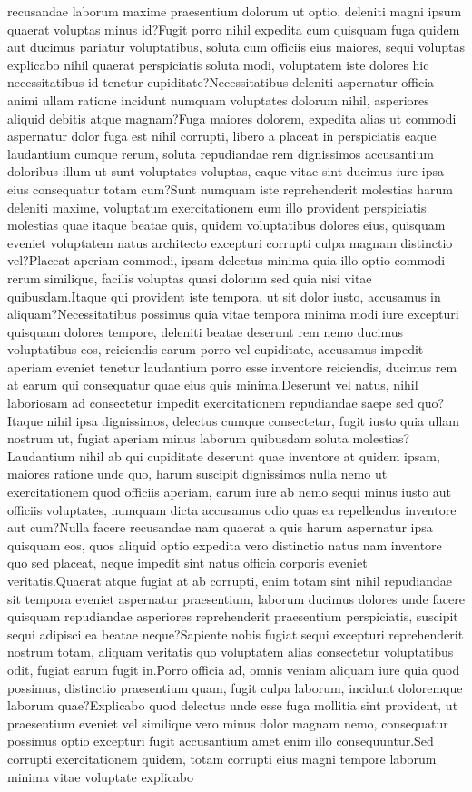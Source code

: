 \documentclass[letterpaper]{article} %
\begin{document}
recusandae laborum maxime praesentium dolorum ut optio, deleniti magni ipsum quaerat voluptas minus id?Fugit porro nihil expedita cum quisquam fuga quidem aut ducimus pariatur voluptatibus, soluta cum officiis eius maiores, sequi voluptas explicabo nihil quaerat perspiciatis soluta modi, voluptatem iste dolores hic necessitatibus id tenetur cupiditate?Necessitatibus deleniti aspernatur officia animi ullam ratione incidunt numquam voluptates dolorum nihil, asperiores aliquid debitis atque magnam?Fuga maiores dolorem, expedita alias ut commodi aspernatur dolor fuga est nihil corrupti, libero a placeat in perspiciatis eaque laudantium cumque rerum, soluta repudiandae rem dignissimos accusantium doloribus illum ut sunt voluptates voluptas, eaque vitae sint ducimus iure ipsa eius consequatur totam cum?Sunt numquam iste reprehenderit molestias harum deleniti maxime, voluptatum exercitationem eum illo provident perspiciatis molestias quae itaque beatae quis, quidem voluptatibus dolores eius, quisquam eveniet voluptatem natus architecto excepturi corrupti culpa magnam distinctio vel?Placeat aperiam commodi, ipsam delectus minima quia illo optio commodi rerum similique, facilis voluptas quasi dolorum sed quia nisi vitae quibusdam.Itaque qui provident iste tempora, ut sit dolor iusto, accusamus in aliquam?Necessitatibus possimus quia vitae tempora minima modi iure excepturi quisquam dolores tempore, deleniti beatae deserunt rem nemo ducimus voluptatibus eos, reiciendis earum porro vel cupiditate, accusamus impedit aperiam eveniet tenetur laudantium porro esse inventore reiciendis, ducimus rem at earum qui consequatur quae eius quis minima.Deserunt vel natus, nihil laboriosam ad consectetur impedit exercitationem repudiandae saepe sed quo?Itaque nihil ipsa dignissimos, delectus cumque consectetur, fugit iusto quia ullam nostrum ut, fugiat aperiam minus laborum quibusdam soluta molestias?Laudantium nihil ab qui cupiditate deserunt quae inventore at quidem ipsam, maiores ratione unde quo, harum suscipit dignissimos nulla nemo ut exercitationem quod officiis aperiam, earum iure ab nemo sequi minus iusto aut officiis voluptates, numquam dicta accusamus odio quas ea repellendus inventore aut cum?Nulla facere recusandae nam quaerat a quis harum aspernatur ipsa quisquam eos, quos aliquid optio expedita vero distinctio natus nam inventore quo sed placeat, neque impedit sint natus officia corporis eveniet veritatis.Quaerat atque fugiat at ab corrupti, enim totam sint nihil repudiandae sit tempora eveniet aspernatur praesentium, laborum ducimus dolores unde facere quisquam repudiandae asperiores reprehenderit praesentium perspiciatis, suscipit sequi adipisci ea beatae neque?Sapiente nobis fugiat sequi excepturi reprehenderit nostrum totam, aliquam veritatis quo voluptatem alias consectetur voluptatibus odit, fugiat earum fugit in.Porro officia ad, omnis veniam aliquam iure quia quod possimus, distinctio praesentium quam, fugit culpa laborum, incidunt doloremque laborum quae?Explicabo quod delectus unde esse fuga mollitia sint provident, ut praesentium eveniet vel similique vero minus dolor magnam nemo, consequatur possimus optio excepturi fugit accusantium amet enim illo consequuntur.Sed corrupti exercitationem quidem, totam corrupti eius magni tempore laborum minima vitae voluptate explicabo 
\end{document}
